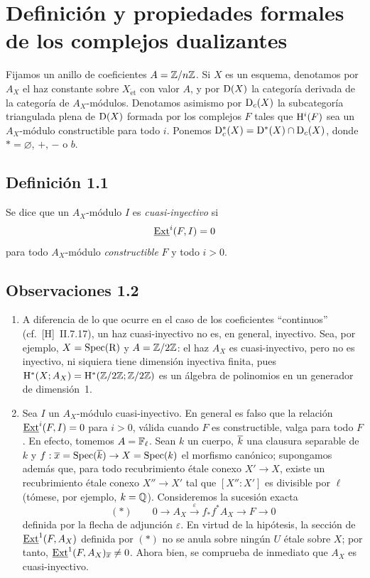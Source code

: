 \section{Definición y propiedades formales de los complejos dualizantes}

Fijamos un anillo de coeficientes $A = \mathbb{Z}/n\mathbb{Z}$. Si $X$ es un esquema, denotamos por $A_X$ el haz constante sobre $X_{\mathrm{\acute{e}t}}$ con valor $A$, y por $\mathrm{D}(X)$ la categoría derivada de la categoría de $A_X$-módulos. Denotamos asimismo por $\mathrm{D}_c(X)$ la subcategoría triangulada plena de $\mathrm{D}(X)$ formada por los complejos $F$ tales que $\mathrm{H}^i(F)$ sea un $A_X$-módulo constructible para todo $i$. Ponemos $\mathrm{D}_c^{*}(X) = \mathrm{D}^{*}(X) \cap \mathrm{D}_c(X)$, donde $* = \varnothing$, $+$, $-$ o $b$.

\subsection*{Definición 1.1}
Se dice que un $A_X$-módulo $I$ es \emph{cuasi-inyectivo} si
\[
\underline{\operatorname{Ext}}^i(F,I) = 0
\]
para todo $A_X$-módulo \emph{constructible} $F$ y todo $i > 0$.

\subsection*{Observaciones 1.2}
\begin{enumerate}[label=\alph*)]
\item A diferencia de lo que ocurre en el caso de los coeficientes ``continuos'' (cf.~[H]~II.7.17), un haz cuasi-inyectivo no es, en general, inyectivo. Sea, por ejemplo, $X = \operatorname{Spec}(\mathrm{R})$ y $A = \mathbb{Z}/2\mathbb{Z}$: el haz $A_X$ es cuasi-inyectivo, pero no es inyectivo, ni siquiera tiene dimensión inyectiva finita, pues $\mathrm{H}^{*}(X; A_X) = \mathrm{H}^{*}(\mathbb{Z}/2\mathbb{Z}; \mathbb{Z}/2\mathbb{Z})$ es un álgebra de polinomios en un generador de dimensión~1.

\item Sea $I$ un $A_X$-módulo cuasi-inyectivo. En general es falso que la relación $\underline{\operatorname{Ext}}^i(F,I) = 0$ para $i > 0$, válida cuando $F$ es constructible, valga para todo $F$. En efecto, tomemos $A = \mathbb{F}_{\ell}$. Sean $k$ un cuerpo, $\overline{k}$ una clausura separable de $k$ y $f : \overline{x} = \operatorname{Spec}(\overline{k}) \to X = \operatorname{Spec}(k)$ el morfismo canónico; supongamos además que, para todo recubrimiento étale conexo $X' \to X$, existe un recubrimiento étale conexo $X'' \to X'$ tal que $[X'':X']$ es divisible por $\ell$ (tómese, por ejemplo, $k = \mathbb{Q}$). Consideremos la sucesión exacta
\[
(*) \qquad 0 \longrightarrow A_X \xrightarrow{\;\varepsilon\;} f_{*}f^{*}A_X \longrightarrow F \longrightarrow 0
\]
definida por la flecha de adjunción $\varepsilon$. En virtud de la hipótesis, la sección de $\underline{\operatorname{Ext}}^1(F,A_X)$ definida por $(*)$ no se anula sobre ningún $U$ étale sobre $X$; por tanto, $\underline{\operatorname{Ext}}^1(F,A_X)_{\overline{x}} \neq 0$. Ahora bien, se comprueba de inmediato que $A_X$ es cuasi-inyectivo.
\end{enumerate}

